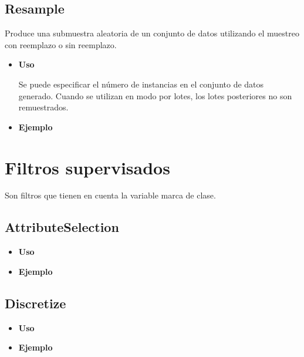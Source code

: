 	\subsection{Resample}
	\begin{justify}
	Produce una submuestra aleatoria de un conjunto de datos utilizando el muestreo con reemplazo o sin reemplazo. 
	\end{justify}
	\begin{itemize}
		\item \textbf{Uso}
	\begin{justify}
	Se puede especificar el número de instancias en el conjunto de datos generado. Cuando se utilizan en modo por lotes, los lotes posteriores no son remuestrados.
	\end{justify}
		\item \textbf{Ejemplo}
	\end{itemize}

\newpage
\section{Filtros supervisados}
	Son filtros que tienen en cuenta la variable marca de clase.	
	\subsection{AttributeSelection}
	\begin{justify}

	\end{justify}
	\begin{itemize}
		\item \textbf{Uso}
	\begin{justify}

	\end{justify}
		\item \textbf{Ejemplo}
	\end{itemize}
	
	\subsection{Discretize}
	\begin{justify}

	\end{justify}
	\begin{itemize}
		\item \textbf{Uso} 
	\begin{justify}

	\end{justify}
		\item \textbf{Ejemplo}
	\end{itemize}
 	
